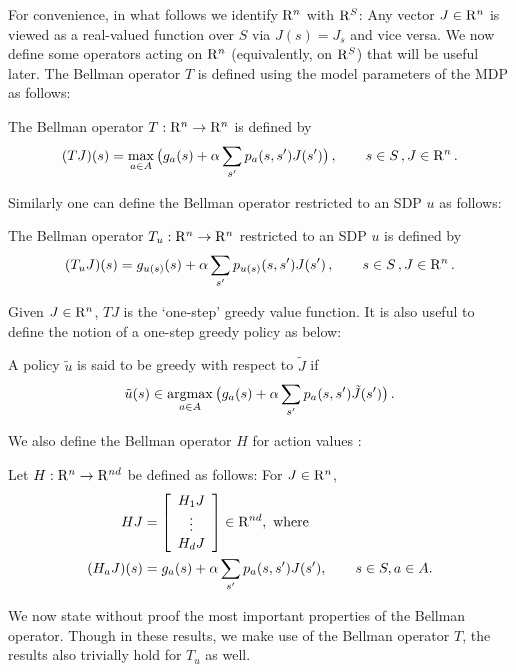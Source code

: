 For convenience, in what follows we identify $\mathrm{R}^n$ with $\mathrm{R}^{S}$:
Any vector $J\in \mathrm{R}^n$ is viewed as a real-valued function over $S$ via $J(s) = J_s$ and vice versa.
We now define some operators acting on $\mathrm{R}^n$ (equivalently, on $\mathrm{R}^S$) that will be useful later.
The Bellman operator $T$ is defined using the model parameters of the MDP as follows:
\begin{definition}
The Bellman operator $T: \mathrm{R}^n \to \mathrm{R}^n$ is defined by 
\begin{align}
(TJ)(s)=\max_{a \in A}\big(g_a(s)+\alpha \sum_{s'} p_a(s,s')J(s')\big)\,,  \qquad s\in S\,,J\in \mathrm{R}^n\,.
\end{align}
\end{definition}
Similarly one can define the Bellman operator restricted to an SDP $u$ as follows:
\begin{definition}
The Bellman operator $T_u:\mathrm{R}^n \to \mathrm{R}^n$  restricted to an SDP $u$ is defined by
\begin{align}
(T_uJ)(s)=g_{u(s)}(s)+\alpha \sum_{s'} p_{u(s)}(s,s')J(s')\,,  \qquad s\in S\,,J\in \mathrm{R}^n\,.
\end{align}
\end{definition}
Given $J \in \mathrm{R}^n$, $TJ$ is the `one-step' greedy value function. It is also useful to define the notion of a one-step greedy policy as below:
\begin{definition}
A policy $\tilde{u}$ is said to be greedy with respect to $\tilde{J}$ if
\begin{align}\label{subpol}
\tilde{u}(s)\in \underset{a \in A}{\argmax} \, \big(g_a(s)+\alpha\sum_{s'} p_a(s,s')\tilde{J}(s')\big)\,.
\end{align}
\end{definition}
We also define the Bellman operator $H$ for action values  \cite{BertB}: 
\begin{definition}\label{bellactval}
Let $H: \mathrm{R}^n \to \mathrm{R}^{nd}$ be defined as follows: For $J\in \mathrm{R}^n$,
\begin{align}
HJ&=\left[ {\begin{array}{c} H_1 J  \\ \vdots \\ H_d J\end{array}} \right]\in \mathrm{R}^{nd}, \text{ where}\nonumber\\
(H_a J)(s)&= g_a(s)+\alpha \sum_{s'}p_a(s,s') J(s'), \qquad s\in S, a\in A.
\end{align}
\end{definition}
We now state without proof the most important properties of the Bellman operator. 
Though in these results, we make use of the Bellman operator $T$, the results also trivially hold for $T_u$ as well.

